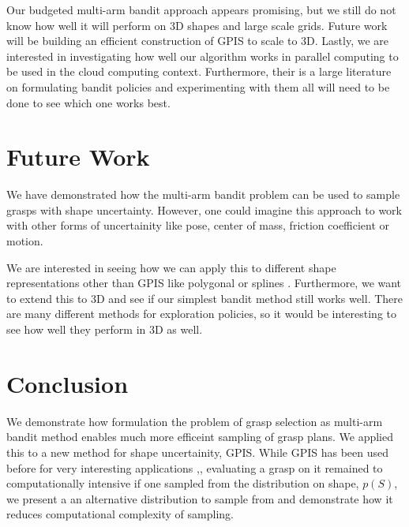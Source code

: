 \documentclass[letterpaper, 10 pt, conference]{ieeeconf}  %
\begin{document}
Our budgeted multi-arm bandit approach appears promising, but we still do not know how well it will perform on 3D shapes and large scale grids. Future work will be building an efficient construction of GPIS to scale to 3D. Lastly, we are interested in investigating how well our algorithm works in parallel computing to be used in the cloud computing context. Furthermore, their is a large literature on formulating bandit policies and experimenting with them all will need to be done to see which one works best. 


\section{Future Work}
We have demonstrated how the multi-arm bandit problem can be used to sample grasps with shape uncertainty. However, one could imagine this approach to work with other forms of uncertainity like pose, center of mass, friction coefficient or motion. 

We are interested in seeing how we can apply this to different shape representations other than GPIS like polygonal \cite{kehoe2012estimating} or splines \cite{christopoulos2007handling}. Furthermore, we want to extend this to 3D and see if our simplest bandit method still works well. There are many different methods for exploration policies, so it would be interesting to see how well they perform in 3D as well. 

\section{Conclusion}

We demonstrate how formulation the problem of grasp selection as multi-arm bandit method enables much more efficeint sampling of grasp plans. We applied this to a new method for shape uncertainity, GPIS. While GPIS has been used before for very interesting applications \cite{hollinger2013},\cite{jeff},\cite{dragiev2011} evaluating a grasp on it remained to computationally intensive if one sampled from the distribution on shape, $p(S)$, we present a an alternative distribution to sample from and demonstrate how it reduces computational complexity of sampling. 




\end{document}
